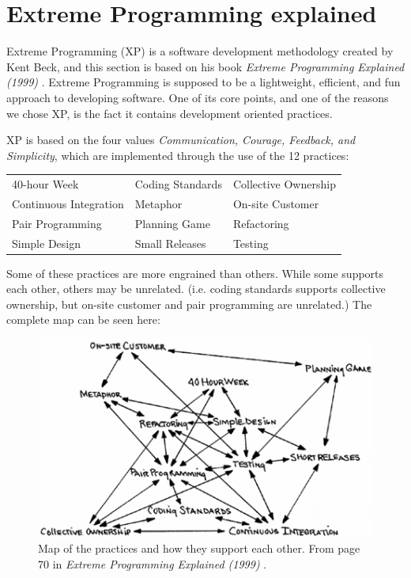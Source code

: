 \section{Extreme Programming explained}
Extreme Programming (XP) is a software development methodology created by Kent Beck, and this section is based on his book \textit{Extreme Programming Explained (1999)} \citep{xp:explained}. 
Extreme Programming is supposed to be a lightweight, efficient, and fun approach to developing software.
One of its core points, and one of the reasons we chose XP, is the fact it contains development oriented practices.

\noindent XP is based on the four values \textit{Communication, Courage, Feedback, and Simplicity}, which are implemented through the use of the 12 practices:

\begin{tabularx}{\textwidth}{X X X}
	40-hour Week				 & Coding Standards & Collective Ownership \\
	Continuous Integration	  & Metaphor         	 & On-site Customer     \\
	Pair Programming			& Planning Game		& Refactoring          \\
	Simple Design          		  & Small Releases   	& Testing             
\end{tabularx}

Some of these practices are more engrained than others. 
While some supports each other, others may be unrelated. (i.e. coding standards supports collective ownership, but on-site customer and pair programming are unrelated.) The complete map can be seen here:
\begin{figure}[H]
	\centering
	\includegraphics[]{Images/xpPracticeSupport.png}
		\caption{Map of the practices and how they support each other.
			From page 70 in \textit{Extreme Programming Explained (1999)} \citep{xp:explained}. }
	\label{fig:practiceSupport}
\end{figure}




